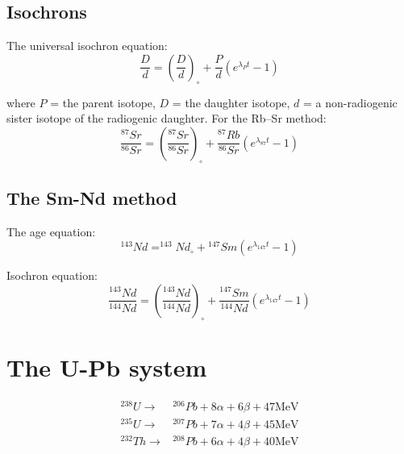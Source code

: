 \documentclass{article}
\begin{document}
\begin{multicols}{3}
\subsection{Isochrons}
\label{sec:isochrons}

The universal isochron equation:
\begin{equation}
\frac{D}{d} = \left(\frac{D}{d}\right)_\circ + \frac{P}{d} (e^{\lambda_{P} t} - 1)
\label{eq:isochron}
\end{equation}

where $P$ = the parent isotope, $D$ = the daughter isotope, $d$ = a
non-radiogenic sister isotope of the radiogenic daughter. For the
Rb--Sr method:
\begin{equation}
\frac{^{87}Sr}{^{86}Sr} =
\left(\frac{^{87}Sr}{^{86}Sr}\right)_\circ +
\frac{^{87}Rb}{^{86}Sr} (e^{\lambda_{87} t} - 1)
\label{eq:87Sr86Sr}
\end{equation}

\subsection{The Sm-Nd method}
\label{sec:Sm-Nd}

The age equation:
\begin{equation}
^{143}Nd = ^{143}Nd_\circ + {}^{147}Sm (e^{\lambda_{147} t} - 1)
\label{eq:144Nd*}
\end{equation}

Isochron equation:
\begin{equation}
\frac{^{143}Nd}{^{144}Nd} =
\left(\frac{^{143}Nd}{^{144}Nd}\right)_{\circ} +
\frac{^{147}Sm}{^{144}Nd} \left(e^{\lambda_{147}t} -
1\right)
\label{eq:143Nd147Nd}
\end{equation}

\section{The U-Pb system}
\label{sec:U-Pb}

\begin{equation}
\begin{array}{rl}
^{238}U \rightarrow & {}^{206}Pb + 8\alpha + 6\beta + 47\mbox{MeV} \\ 
^{235}U \rightarrow & {}^{207}Pb + 7\alpha + 4\beta + 45\mbox{MeV} \\
^{232}Th \rightarrow & {}^{208}Pb + 6\alpha + 4\beta + 40\mbox{MeV} 
\end{array}
\label{eq:UThdecay}
\end{equation}


\end{multicols}
\end{document}
